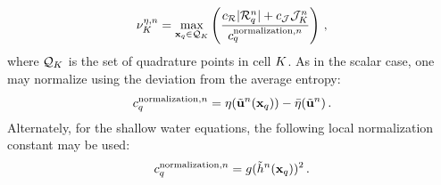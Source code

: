 \begin{equation}
   \entropycellviscosity[n]
     = \max\limits_{\x_q\in \mathcal{Q}_\cell}\pr{\frac{\entropyresidualcoef
     |\entropyresidual_q^\timeindex|
     + \entropyjumpcoef\entropyjump_\cell^\timeindex}
     {c^{\text{normalization},\timeindex}_q}}
   \eqc
\end{equation}
where $\mathcal{Q}_K$ is the set of quadrature points in cell $K$.
As in the scalar case, one may normalize using the deviation from the average
entropy:
\begin{equation}
  c^{\text{normalization},n}_q
    = \eta(\tilde{\mathbf{u}}^n(\mathbf{x}_q))
   -\bar{\eta}(\tilde{\mathbf{u}}^n)
  \,.
\end{equation}
Alternately, for the shallow water equations, the following local normalization
constant may be used:
\begin{equation}
  c^{\text{normalization},n}_q
  = g (\tilde{h}^n(\mathbf{x}_q))^2
  \,.
\end{equation}


